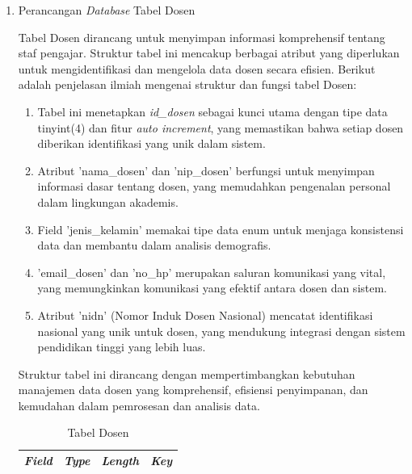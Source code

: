 \begin{enumerate}

	\item Perancangan \textit{Database} Tabel Dosen

	      Tabel Dosen dirancang untuk menyimpan informasi komprehensif tentang staf pengajar. Struktur tabel ini mencakup berbagai atribut yang diperlukan untuk mengidentifikasi dan mengelola data dosen secara efisien. Berikut adalah penjelasan ilmiah mengenai struktur dan fungsi tabel Dosen:

	      \begin{enumerate}[label=\alph*.]
		      \item Tabel ini menetapkan \textit{id\_dosen} sebagai kunci utama dengan tipe data tinyint(4) dan fitur \textit{auto increment}, yang memastikan bahwa setiap dosen diberikan identifikasi yang unik dalam sistem.
		      \item Atribut 'nama\_dosen' dan 'nip\_dosen' berfungsi untuk menyimpan informasi dasar tentang dosen, yang memudahkan pengenalan personal dalam lingkungan akademis.
		      \item Field 'jenis\_kelamin' memakai tipe data enum untuk menjaga konsistensi data dan membantu dalam analisis demografis.
		      \item 'email\_dosen' dan 'no\_hp' merupakan saluran komunikasi yang vital, yang memungkinkan komunikasi yang efektif antara dosen dan sistem.
		      \item Atribut 'nidn' (Nomor Induk Dosen Nasional) mencatat identifikasi nasional yang unik untuk dosen, yang mendukung integrasi dengan sistem pendidikan tinggi yang lebih luas.
	      \end{enumerate}

	      Struktur tabel ini dirancang dengan mempertimbangkan kebutuhan manajemen data dosen yang komprehensif, efisiensi penyimpanan, dan kemudahan dalam pemrosesan dan analisis data.

		      {
			      \fontsize{11}{13}\selectfont
			      \begin{longtable}{l l l l}
				      \caption{Tabel Dosen}
				      \label{admin}                                                                                               \\
				      \hline
				      \textbf{\textit{Field}} & \textbf{\textit{Type}} & \textbf{\textit{Length}}   & \textbf{\textit{Key}}       \\
				      \hline
				      \endfirsthead


\end{longtable}}
\end{enumerate}
